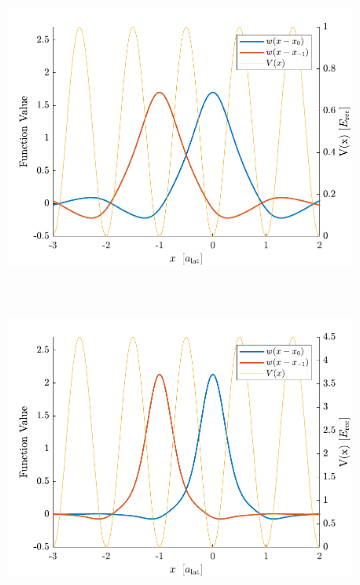 \begin{figure}[t]
    \centering
    \begin{subfigure}[t]{0.49\textwidth}
        \includegraphics[width=\textwidth]{Figures/WannierPlot1.pdf}
    \end{subfigure}
    ~
    \begin{subfigure}[t]{0.49\textwidth}
        \includegraphics[width=\textwidth]{Figures/WannierPlot2.pdf}
    \end{subfigure}
    ~
    \begin{subfigure}[t]{0.49\textwidth}

\end{subfigure}
\end{figure}
